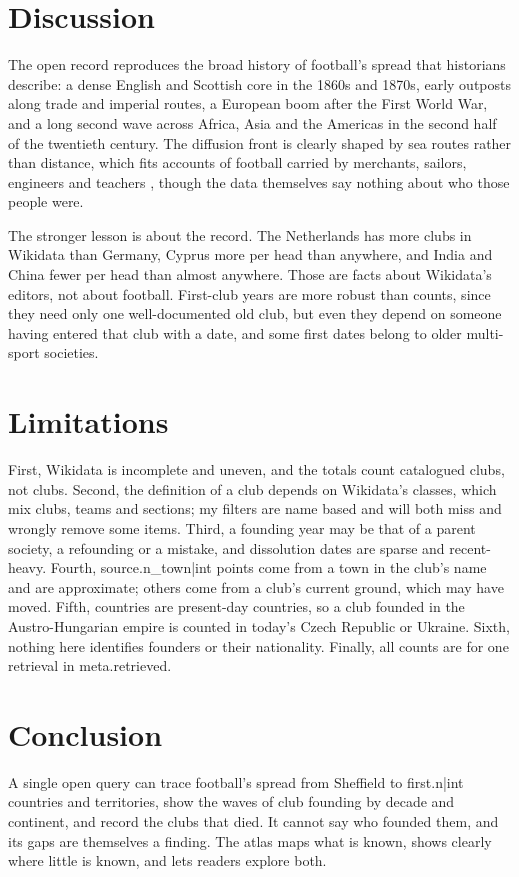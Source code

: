 \documentclass[11pt,a4paper]{article}
\begin{document}
\section{Discussion}
The open record reproduces the broad history of football's spread that historians describe: a dense English and Scottish core in the 1860s and 1870s, early outposts along trade and imperial routes, a European boom after the First World War, and a long second wave across Africa, Asia and the Americas in the second half of the twentieth century. The diffusion front is clearly shaped by sea routes rather than distance, which fits accounts of football carried by merchants, sailors, engineers and teachers \citep{goldblatt}, though the data themselves say nothing about who those people were.

The stronger lesson is about the record. The Netherlands has more clubs in Wikidata than Germany, Cyprus more per head than anywhere, and India and China fewer per head than almost anywhere. Those are facts about Wikidata's editors, not about football. First-club years are more robust than counts, since they need only one well-documented old club, but even they depend on someone having entered that club with a date, and some first dates belong to older multi-sport societies.

\section{Limitations}
First, Wikidata is incomplete and uneven, and the totals count catalogued clubs, not clubs. Second, the definition of a club depends on Wikidata's classes, which mix clubs, teams and sections; my filters are name based and will both miss and wrongly remove some items. Third, a founding year may be that of a parent society, a refounding or a mistake, and dissolution dates are sparse and recent-heavy. Fourth, {{source.n_town|int}} points come from a town in the club's name and are approximate; others come from a club's current ground, which may have moved. Fifth, countries are present-day countries, so a club founded in the Austro-Hungarian empire is counted in today's Czech Republic or Ukraine. Sixth, nothing here identifies founders or their nationality. Finally, all counts are for one retrieval in {{meta.retrieved}}.

\section{Conclusion}
A single open query can trace football's spread from Sheffield to {{first.n|int}} countries and territories, show the waves of club founding by decade and continent, and record the clubs that died. It cannot say who founded them, and its gaps are themselves a finding. The atlas maps what is known, shows clearly where little is known, and lets readers explore both.
\end{document}
